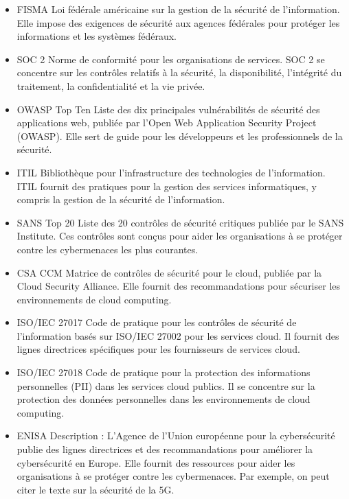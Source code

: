 \begin{itemize}
	\item FISMA
	Loi fédérale américaine sur la gestion de la sécurité de l'information. Elle impose des exigences de sécurité aux agences fédérales pour protéger les informations et les systèmes fédéraux.
	
	\item  SOC 2
	Norme de conformité pour les organisations de services. SOC 2 se concentre sur les contrôles relatifs à la sécurité, la disponibilité, l'intégrité du traitement, la confidentialité et la vie privée.
	
	\item OWASP Top Ten
	Liste des dix principales vulnérabilités de sécurité des applications web, publiée par l'Open Web Application Security Project (OWASP). Elle sert de guide pour les développeurs et les professionnels de la sécurité.
	
	\item ITIL
	Bibliothèque pour l'infrastructure des technologies de l'information. ITIL fournit des pratiques pour la gestion des services informatiques, y compris la gestion de la sécurité de l'information.
	
	\item SANS Top 20
	Liste des 20 contrôles de sécurité critiques publiée par le SANS Institute. Ces contrôles sont conçus pour aider les organisations à se protéger contre les cybermenaces les plus courantes.
	
	\item CSA CCM
	Matrice de contrôles de sécurité pour le cloud, publiée par la Cloud Security Alliance. Elle fournit des recommandations pour sécuriser les environnements de cloud computing.
	
	\item ISO/IEC 27017
	Code de pratique pour les contrôles de sécurité de l'information basés sur ISO/IEC 27002 pour les services cloud. Il fournit des lignes directrices spécifiques pour les fournisseurs de services cloud.
	
	\item ISO/IEC 27018
	Code de pratique pour la protection des informations personnelles (PII) dans les services cloud publics. Il se concentre sur la protection des données personnelles dans les environnements de cloud computing.
	
	\item ENISA
	Description : L'Agence de l'Union européenne pour la cybersécurité publie des lignes directrices et des recommandations pour améliorer la cybersécurité en Europe. Elle fournit des ressources pour aider les organisations à se protéger contre les cybermenaces. Par exemple, on peut citer le texte sur la sécurité de la 5G.
	
\end{itemize}

